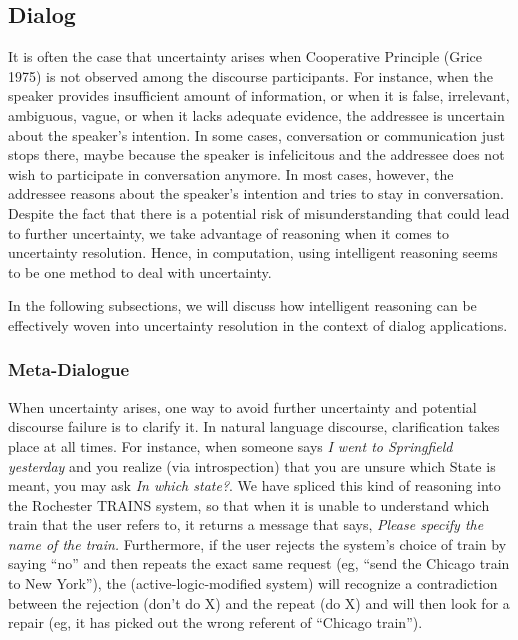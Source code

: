 \subsection{Dialog}
	It is often the case that uncertainty arises when Cooperative
	Principle (Grice 1975) is not observed among the discourse
	participants.  For instance, when the speaker provides
	insufficient amount of information, or when it is false,
	irrelevant, ambiguous, vague, or when it lacks adequate
	evidence, the addressee is uncertain about the speaker's
	intention.  In some cases, conversation or communication just
	stops there, maybe because the speaker is infelicitous and the
	addressee does not wish to participate in conversation
	anymore.  In most cases, however, the addressee reasons about
	the speaker's intention and tries to stay in conversation.
	Despite the fact that there is a potential risk of
	misunderstanding that could lead to further uncertainty, we take advantage of reasoning 
	when it comes to uncertainty resolution.
	Hence, in computation, using intelligent reasoning seems to be one method to deal with uncertainty.


In the following subsections, we will discuss how
	intelligent reasoning can be effectively woven into
	uncertainty resolution in the context of dialog applications.


\subsubsection{Meta-Dialogue}
When uncertainty arises, one way to avoid further uncertainty and
potential discourse failure is to clarify it.  In natural language
discourse, clarification takes place at all times.  For instance, when
someone says {\em I went to Springfield yesterday} and you realize
(via introspection) that you are unsure which State is meant, you may
ask {\em In which state?}. 
We have spliced this kind of reasoning into the Rochester TRAINS \cite{trains...}
system, so that when it is unable to understand which train that 
the user refers to, it returns a message that says, {\em Please
specify the name of the train.} Furthermore, if the user rejects the
system's choice of train by saying ``no'' and then repeats the exact
same request (eg, ``send the Chicago train to New York''), the
(active-logic-modified system) will recognize a contradiction between
the rejection (don't do X) and the repeat (do X) and will then look
for a repair (eg, it has picked out the wrong referent of ``Chicago
train''). 


